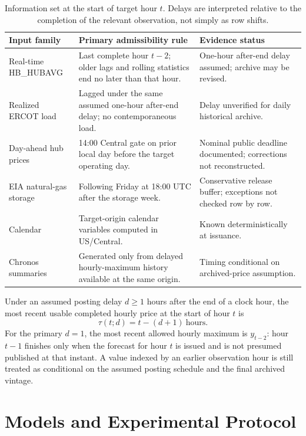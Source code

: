 \documentclass[11pt,letterpaper]{article}
\begin{document}
\begin{table}[t]
\centering\small
\caption{Information set at the start of target hour $t$. Delays are interpreted relative to the completion of the relevant observation, not simply as row shifts.}\label{tab:availability}
\begin{tabularx}{\linewidth}{@{}p{2.65cm}X p{2.7cm}@{}}
\toprule
Input family & Primary admissibility rule & Evidence status \\
\midrule
Real-time HB\_HUBAVG & Last complete hour $t-2$; older lags and rolling statistics end no later than that hour. & One-hour after-end delay assumed; archive may be revised. \\
Realized ERCOT load & Lagged under the same assumed one-hour after-end delay; no contemporaneous load. & Delay unverified for daily historical archive. \\
Day-ahead hub prices & 14:00 Central gate on prior local day before the target operating day. & Nominal public deadline documented; corrections not reconstructed. \\
EIA natural-gas storage & Following Friday at 18:00 UTC after the storage week. & Conservative release buffer; exceptions not checked row by row. \\
Calendar & Target-origin calendar variables computed in US/Central. & Known deterministically at issuance. \\
Chronos summaries & Generated only from delayed hourly-maximum history available at the same origin. & Timing conditional on archived-price assumption. \\
\bottomrule
\end{tabularx}
\end{table}

Under an assumed posting delay $d\geq1$ hours after the end of a clock hour, the most recent usable completed hourly price at the start of hour $t$ is
\begin{equation}\label{eq:cutoff}
  \tau(t;d)=t-(d+1)\ \text{hours}.
\end{equation}
For the primary $d=1$, the most recent allowed hourly maximum is $y_{t-2}$: hour $t-1$ finishes only when the forecast for hour $t$ is issued and is not presumed published at that instant. A value indexed by an earlier observation hour is still treated as conditional on the assumed posting schedule and the final archived vintage.

\section{Models and Experimental Protocol}\label{sec:methods}
\end{document}
